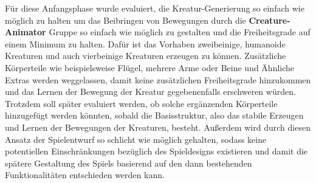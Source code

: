 Für diese Anfangsphase wurde evaluiert, die Kreatur-Generierung so einfach wie möglich zu halten um das Beibringen von Bewegungen durch die \textbf{Creature-Animator} Gruppe so einfach wie möglich zu gestalten und die Freiheitsgrade auf einem Minimum zu halten. Dafür ist das Vorhaben zweibeinige, humanoide Kreaturen und auch vierbeinige Kreaturen erzeugen zu können. Zusätzliche Körperteile wie beispielsweise Flügel, mehrere Arme oder Beine und Ähnliche Extras werden weggelassen, damit keine zusätzlichen Freiheitsgrade hinzukommen und das Lernen der Bewegung der Kreatur gegebenenfalls erschweren würden. Trotzdem soll später evaluiert werden, ob solche ergänzenden Körperteile hinzugefügt werden könnten, sobald die Basisstruktur, also das stabile Erzeugen und Lernen der Bewegungen der Kreaturen, besteht. Außerdem wird durch diesen Ansatz der Spielentwurf so schlicht wie möglich gehalten, sodass keine potentiellen Einschränkungen bezüglich des Spieldesigns existieren und damit die spätere Gestaltung des Spiels basierend auf den dann bestehenden Funktionalitäten entschieden werden kann. 



